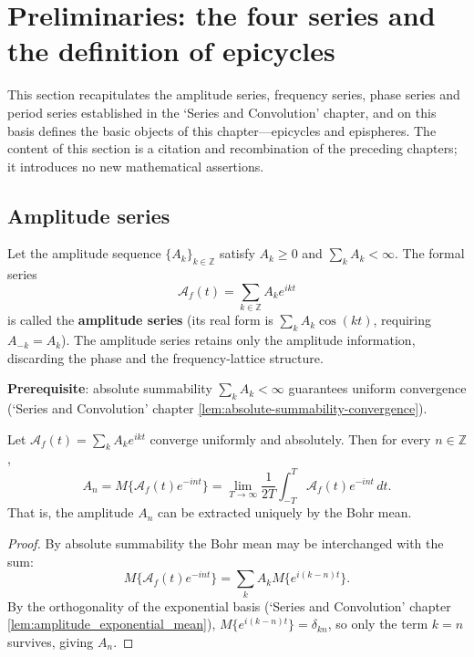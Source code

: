 \section{Preliminaries: the four series and the definition of epicycles}
\label{sec:dyn_prerequisites}

This section recapitulates the amplitude series, frequency series, phase series and period series established in the `Series and Convolution' chapter, and on this basis defines the basic objects of this chapter---epicycles and epispheres. The content of this section is a citation and recombination of the preceding chapters; it introduces no new mathematical assertions.

\subsection{Amplitude series}

\begin{definition}\label{def:dyn_amplitude_series}
Let the amplitude sequence $\{A_k\}_{k\in\mathbb Z}$ satisfy $A_k\ge 0$ and $\sum_k A_k<\infty$. The formal series
\[
\mathcal A_f(t)=\sum_{k\in\mathbb Z}A_k e^{ikt}
\]
is called the \textbf{amplitude series} (its real form is $\sum_k A_k\cos(kt)$, requiring $A_{-k}=A_k$). The amplitude series retains only the amplitude information, discarding the phase and the frequency-lattice structure.

\textbf{Prerequisite}: absolute summability $\sum_k A_k<\infty$ guarantees uniform convergence (`Series and Convolution' chapter \cref{lem:absolute-summability-convergence}).
\end{definition}

\begin{proposition}\label{prop:dyn_amplitude_coefficient}
Let $\mathcal A_f(t)=\sum_k A_k e^{ikt}$ converge uniformly and absolutely. Then for every $n\in\mathbb Z$,
\[
A_n=M\{\mathcal A_f(t)e^{-int}\}=\lim_{T\to\infty}\frac{1}{2T}\int_{-T}^{T}\mathcal A_f(t)e^{-int}\,dt.
\]
That is, the amplitude $A_n$ can be extracted uniquely by the Bohr mean.
\end{proposition}

\begin{proof}
By absolute summability the Bohr mean may be interchanged with the sum:
\[
M\{\mathcal A_f(t)e^{-int}\}=\sum_k A_k M\{e^{i(k-n)t}\}.
\]
By the orthogonality of the exponential basis (`Series and Convolution' chapter \cref{lem:amplitude_exponential_mean}), $M\{e^{i(k-n)t}\}=\delta_{kn}$, so only the term $k=n$ survives, giving $A_n$.
\end{proof}

